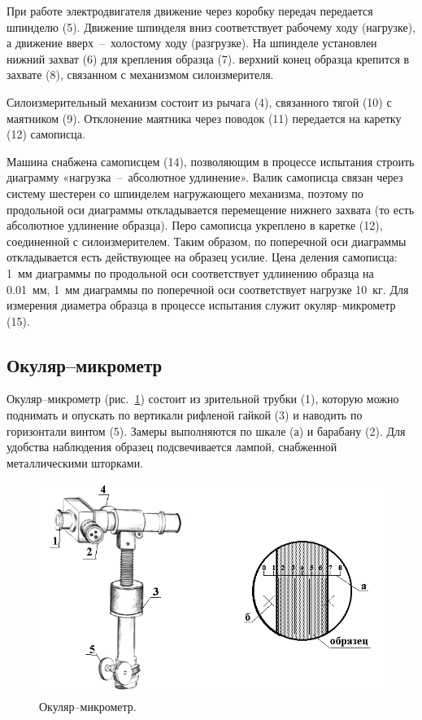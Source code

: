 \documentclass[12pt, a4paper]{article}
\begin{document}
    При работе электродвигателя движение через коробку передач передается шпинделю (5). Движение шпинделя вниз соответствует рабочему ходу (нагрузке), а движение вверх~--~холостому ходу (разгрузке). На шпинделе установлен нижний захват (6) для крепления образца (7). верхний конец образца крепится в захвате (8), связанном с механизмом силоизмерителя.
    
    Силоизмерительный механизм состоит из рычага (4), связанного тягой (10) с маятником (9). Отклонение маятника через поводок (11) передается на каретку (12) самописца.
    
    Машина снабжена самописцем (14), позволяющим в процессе испытания строить диаграмму «нагрузка~--~абсолютное удлинение». Валик самописца связан через систему шестерен со шпинделем нагружающего механизма, поэтому по продольной оси диаграммы откладывается перемещение нижнего захвата (то есть абсолютное удлинение образца). Перо самописца укреплено в каретке (12), соединенной с силоизмерителем. Таким образом, по поперечной оси диаграммы откладывается есть действующее на образец усилие. Цена деления самописца: 1~мм диаграммы по продольной оси соответствует удлинению образца на 0.01~мм, 1~мм диаграммы по поперечной оси соответствует нагрузке 10~кг. Для измерения диаметра образца в процессе испытания служит окуляр–микрометр (15).
    
    \subsection{Окуляр–микрометр}
    
    Окуляр–микрометр (рис.~\ref{im2}) состоит из зрительной трубки (1), которую можно поднимать и опускать по вертикали рифленой гайкой (3) и наводить по горизонтали винтом (5). Замеры выполняются по шкале (а) и барабану (2). Для удобства наблюдения образец подсвечивается лампой, снабженной металлическими шторками.
    
    \begin{figure}[h]
        \centering
        \includegraphics[width = 13cm]{image_2.png}
        \caption{Окуляр–микрометр.}
        \label{im2}
    \end{figure}
    
\end{document}
